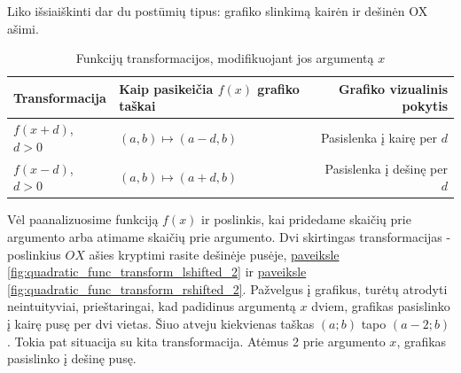\documentclass[nobib]{tufte-handout}
\begin{document}
Liko išsiaiškinti dar du postūmių tipus: grafiko slinkimą kairėn ir dešinėn OX
ašimi.

\begin{table}[!htpb]
  \centering
  \begin{tabular}{
    l | %
    >{\raggedleft\arraybackslash}p{3cm} | %
    r	%
    }
    \toprule
    {Transformacija}  & {Kaip pasikeičia $f(x)$ grafiko taškai}
                      & {Grafiko vizualinis pokytis}            \\
    \midrule
    {$f(x+d)$, $d>0$} & {$(a,b)\mapsto(a-d, b)$}
                      & {Pasislenka į kairę per $d$}            \\
    {$f(x-d)$, $d>0$} & {$(a,b)\mapsto(a+d, b)$}
                      & {Pasislenka į dešinę per $d$}           \\
    \bottomrule
  \end{tabular}
  \vspace{16pt} %
  \caption{Funkcijų transformacijos, modifikuojant jos argumentą $x$}
  \label{tbl:after_transformations}
\end{table}

Vėl paanalizuosime funkciją $f(x)$ ir poslinkis, kai pridedame skaičių prie
argumento
arba atimame skaičių prie argumento. Dvi skirtingas transformacijas -
poslinkius $OX$ ašies kryptimi rasite dešinėje pusėje,
\hyperref[fig:quadratic_func_transform_lshifted_2]{paveiksle
  \ref*{fig:quadratic_func_transform_lshifted_2}} ir
\hyperref[fig:quadratic_func_transform_rshifted_2]{paveiksle
  \ref*{fig:quadratic_func_transform_rshifted_2}}. Pažvelgus į grafikus, turėtų
atrodyti neintuityviai, prieštaringai, kad padidinus argumentą $x$ dviem,
grafikas pasislinko į kairę pusę per dvi vietas. Šiuo atveju kiekvienas taškas
$(a;b)$ tapo $(a-2;b)$. Tokia pat situacija su kita transformacija. Atėmus 2
prie argumento $x$, grafikas pasislinko į dešinę pusę.
\end{document}
